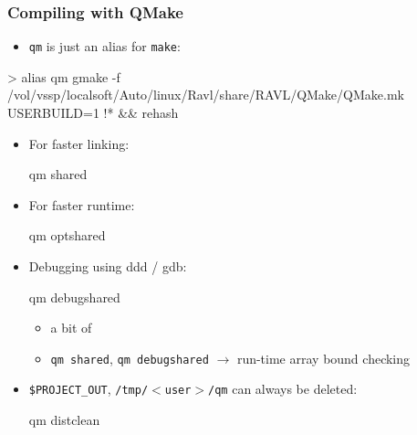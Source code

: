 \documentclass[landscape]{beamer}
\begin{document}
\begin{frame}[fragile]\frametitle{Compiling with QMake}


  \begin{itemize}
  \pause\item {\tt qm} is just an alias for {\tt make}:
  \end{itemize}
\begin{VerbatimXterm}[fontsize=\tiny]
> alias qm 
gmake -f /vol/vssp/localsoft/Auto/linux/Ravl/share/RAVL/QMake/QMake.mk USERBUILD=1 !* && rehash
\end{VerbatimXterm}
  \vspace{-1.5ex}
  \begin{itemize}
  \pause\item For faster linking:
\begin{VerbatimXterm}
  qm shared
\end{VerbatimXterm}
    \pause\item For faster runtime:
\begin{VerbatimXterm}
  qm optshared
\end{VerbatimXterm}
    \pause\item Debugging using ddd / gdb:
\begin{VerbatimXterm}
  qm debugshared
\end{VerbatimXterm}
    \begin{itemize}
      \pause\item a bit of 
      \pause\item \verb|qm shared|, \verb|qm debugshared| $\rightarrow$ run-time array bound checking
      
    \end{itemize}

    \pause\item {\tt \$PROJECT\_OUT}, {\tt /tmp/$<$user$>$/qm} can always be deleted:
\begin{VerbatimXterm}
  qm distclean
\end{VerbatimXterm}

  \end{itemize}
\end{frame}
\end{document}
